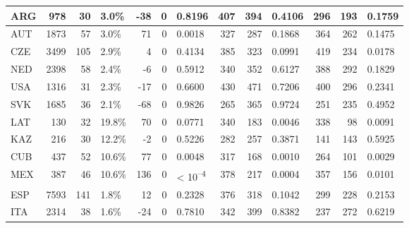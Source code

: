 \begin{tabular}{l|r|r|l|r|r|l|r|r|l|r|r|l}
\hline
ARG & 978 & 30 & 3.0\% & -38 & 0 & 0.8196 & 407 & 394 & 0.4106 & 296 & 193 & 0.1759\\
\hline
AUT & 1873 & 57 & 3.0\% & 71 & 0 & 0.0018 & 327 & 287 & 0.1868 & 364 & 262 & 0.1475\\
\hline
CZE & 3499 & 105 & 2.9\% & 4 & 0 & 0.4134 & 385 & 323 & 0.0991 & 419 & 234 & 0.0178\\
\hline
NED & 2398 & 58 & 2.4\% & -6 & 0 & 0.5912 & 340 & 352 & 0.6127 & 388 & 292 & 0.1829\\
\hline
USA & 1316 & 31 & 2.3\% & -17 & 0 & 0.6600 & 430 & 471 & 0.7206 & 400 & 296 & 0.2341\\
\hline
SVK & 1685 & 36 & 2.1\% & -68 & 0 & 0.9826 & 265 & 365 & 0.9724 & 251 & 235 & 0.4952\\
\hline
LAT & 130 & 32 & 19.8\% & 70 & 0 & 0.0771 & 340 & 183 & 0.0046 & 338 & 98 & 0.0091\\
\hline
KAZ & 216 & 30 & 12.2\% & -2 & 0 & 0.5226 & 282 & 257 & 0.3871 & 141 & 143 & 0.5925\\
\hline
CUB & 437 & 52 & 10.6\% & 77 & 0 & 0.0048 & 317 & 168 & 0.0010 & 264 & 101 & 0.0029\\
\hline
MEX & 387 & 46 & 10.6\% & 136 & 0 & < 10\textsuperscript{--4} & 378 & 217 & 0.0004 & 357 & 156 & 0.0101\\
\hline
ESP & 7593 & 141 & 1.8\% & 12 & 0 & 0.2328 & 376 & 318 & 0.1042 & 299 & 228 & 0.2153\\
\hline
ITA & 2314 & 38 & 1.6\% & -24 & 0 & 0.7810 & 342 & 399 & 0.8382 & 237 & 272 & 0.6219\\
\hline
\end{tabular}
